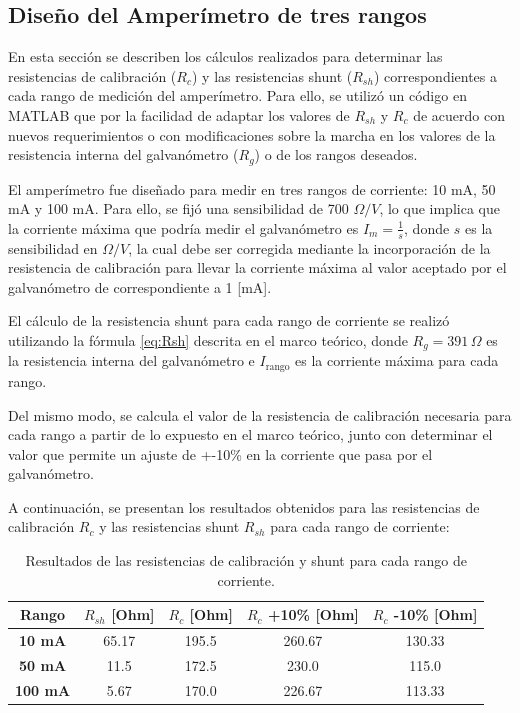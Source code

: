 \subsection{Diseño del Amperímetro de tres rangos}
En esta sección se describen los cálculos realizados para determinar las resistencias de calibración (\( R_c \)) y las resistencias shunt (\( R_{sh} \)) correspondientes a cada rango de medición del amperímetro. Para ello, se utilizó un código en MATLAB que por la facilidad de adaptar los valores de \( R_{sh} \) y \( R_c \) de acuerdo con nuevos requerimientos o con modificaciones sobre la marcha en los valores de la resistencia interna del galvanómetro (\( R_g \)) o de los rangos deseados.

El amperímetro fue diseñado para medir en tres rangos de corriente: 10 mA, 50 mA y 100 mA. Para ello, se fijó una sensibilidad de 700 \(\Omega/V\), lo que implica que la corriente máxima que podría medir el galvanómetro es \( I_m = \frac{1}{s} \), donde \( s \) es la sensibilidad en \(\Omega/V\), la cual debe ser corregida mediante la incorporación de la resistencia de calibración para llevar la corriente máxima al valor aceptado por el galvanómetro de correspondiente a 1 [mA]. 

El cálculo de la resistencia shunt para cada rango de corriente se realizó utilizando la fórmula \ref{eq:Rsh} descrita en el marco teórico, donde \( R_g = 391 \, \Omega \) es la resistencia interna del galvanómetro e \( I_{\text{rango}} \) es la corriente máxima para cada rango.

Del mismo modo, se calcula el valor de la resistencia de calibración necesaria para cada rango a partir de lo expuesto en el marco teórico, junto con determinar el valor que permite un ajuste de +-10\% en la corriente que pasa por el galvanómetro. 

A continuación, se presentan los resultados obtenidos para las resistencias de calibración \( R_c \) y las resistencias shunt \( R_{sh} \) para cada rango de corriente:

\begin{table}[h]
\centering
\caption{Resultados de las resistencias de calibración y shunt para cada rango de corriente.}
\begin{tabular}{|c|c|c|c|c|}
\hline
\textbf{Rango} & \textbf{\( R_{sh} \) [Ohm]}  & \textbf{\( R_c \) [Ohm]} & \textbf{\( R_c \) +10\% [Ohm]} & \textbf{\( R_c \) -10\% [Ohm]} \\ \hline
\textbf{10 mA}  & 65.17 & 195.5 & 260.67 & 130.33 \\ \hline
\textbf{50 mA}  & 11.5 & 172.5  & 230.0  & 115.0  \\ \hline
\textbf{100 mA}  & 5.67 & 170.0 & 226.67 & 113.33 \\ \hline
\end{tabular}
\label{tab:ResitShuntyCal}
\end{table}


